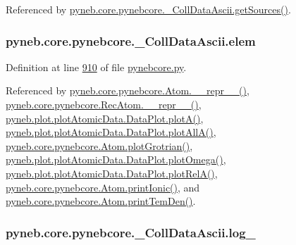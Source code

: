 Referenced by \hyperlink{pynebcore_8py_source_l01003}{pyneb.\+core.\+pynebcore.\+\_\+\+Coll\+Data\+Ascii.\+get\+Sources()}.

\hypertarget{classpyneb_1_1core_1_1pynebcore_1_1___coll_data_ascii_a2e7f8f27e94e2aa068d869cd4dad2ee2}{}
\subsubsection[{elem}]{\setlength{\rightskip}{0pt plus 5cm}pyneb.\+core.\+pynebcore.\+\_\+\+Coll\+Data\+Ascii.\+elem}\label{classpyneb_1_1core_1_1pynebcore_1_1___coll_data_ascii_a2e7f8f27e94e2aa068d869cd4dad2ee2}


Definition at line \hyperlink{pynebcore_8py_source_l00910}{910} of file \hyperlink{pynebcore_8py_source}{pynebcore.\+py}.



Referenced by \hyperlink{pynebcore_8py_source_l02544}{pyneb.\+core.\+pynebcore.\+Atom.\+\_\+\+\_\+repr\+\_\+\+\_\+()}, \hyperlink{pynebcore_8py_source_l03032}{pyneb.\+core.\+pynebcore.\+Rec\+Atom.\+\_\+\+\_\+repr\+\_\+\+\_\+()}, \hyperlink{plot_atomic_data_8py_source_l00116}{pyneb.\+plot.\+plot\+Atomic\+Data.\+Data\+Plot.\+plot\+A()}, \hyperlink{plot_atomic_data_8py_source_l00188}{pyneb.\+plot.\+plot\+Atomic\+Data.\+Data\+Plot.\+plot\+All\+A()}, \hyperlink{pynebcore_8py_source_l02372}{pyneb.\+core.\+pynebcore.\+Atom.\+plot\+Grotrian()}, \hyperlink{plot_atomic_data_8py_source_l00372}{pyneb.\+plot.\+plot\+Atomic\+Data.\+Data\+Plot.\+plot\+Omega()}, \hyperlink{plot_atomic_data_8py_source_l00261}{pyneb.\+plot.\+plot\+Atomic\+Data.\+Data\+Plot.\+plot\+Rel\+A()}, \hyperlink{pynebcore_8py_source_l02167}{pyneb.\+core.\+pynebcore.\+Atom.\+print\+Ionic()}, and \hyperlink{pynebcore_8py_source_l02253}{pyneb.\+core.\+pynebcore.\+Atom.\+print\+Tem\+Den()}.

\hypertarget{classpyneb_1_1core_1_1pynebcore_1_1___coll_data_ascii_a9277c108416ceb0bbdca484a4a246b5c}{}
\subsubsection[{log\+\_\+}]{\setlength{\rightskip}{0pt plus 5cm}pyneb.\+core.\+pynebcore.\+\_\+\+Coll\+Data\+Ascii.\+log\+\_\+}\label{classpyneb_1_1core_1_1pynebcore_1_1___coll_data_ascii_a9277c108416ceb0bbdca484a4a246b5c}


